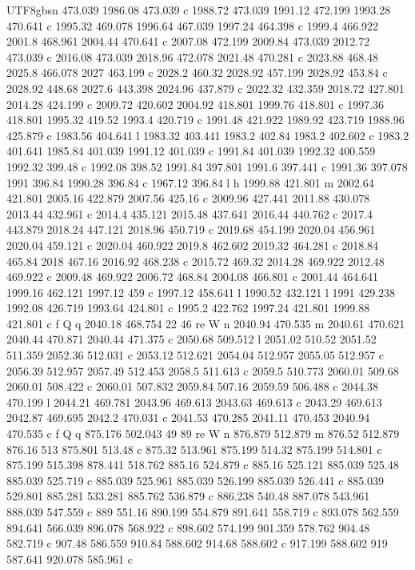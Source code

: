 \documentclass[11pt,a4paper,oneside]{report}
\begin{document}
\begin{CJK*}{UTF8}{gbsn}
{473.039 1986.08 473.039 c 1988.72 473.039 1991.12 472.199 1993.28 470.641 c 1995.32 469.078 1996.64
467.039 1997.24 464.398 c 1999.4 466.922 2001.8 468.961 2004.44 470.641 c 2007.08 472.199 2009.84 473.039
2012.72 473.039 c 2016.08 473.039 2018.96 472.078 2021.48 470.281 c 2023.88 468.48 2025.8 466.078 2027
463.199 c 2028.2 460.32 2028.92 457.199 2028.92 453.84 c 2028.92 448.68 2027.6 443.398 2024.96 437.879 c
2022.32 432.359 2018.72 427.801 2014.28 424.199 c 2009.72 420.602 2004.92 418.801 1999.76 418.801 c
1997.36 418.801 1995.32 419.52 1993.4 420.719 c 1991.48 421.922 1989.92 423.719 1988.96 425.879 c 1983.56
404.641 l 1983.32 403.441 1983.2 402.84 1983.2 402.602 c 1983.2 401.641 1985.84 401.039 1991.12 401.039 c
1991.84 401.039 1992.32 400.559 1992.32 399.48 c 1992.08 398.52 1991.84 397.801 1991.6 397.441 c 1991.36
397.078 1991 396.84 1990.28 396.84 c 1967.12 396.84 l h 1999.88 421.801 m 2002.64 421.801 2005.16 422.879
2007.56 425.16 c 2009.96 427.441 2011.88 430.078 2013.44 432.961 c 2014.4 435.121 2015.48 437.641 2016.44
440.762 c 2017.4 443.879 2018.24 447.121 2018.96 450.719 c 2019.68 454.199 2020.04 456.961 2020.04
459.121 c 2020.04 460.922 2019.8 462.602 2019.32 464.281 c 2018.84 465.84 2018 467.16 2016.92 468.238 c
2015.72 469.32 2014.28 469.922 2012.48 469.922 c 2009.48 469.922 2006.72 468.84 2004.08 466.801 c 2001.44
464.641 1999.16 462.121 1997.12 459 c 1997.12 458.641 l 1990.52 432.121 l 1991 429.238 1992.08 426.719
1993.64 424.801 c 1995.2 422.762 1997.24 421.801 1999.88 421.801 c f Q q 2040.18 468.754 22 46 re W n
2040.94 470.535 m 2040.61 470.621 2040.44 470.871 2040.44 471.375 c 2050.68 509.512 l 2051.02 510.52
2051.52 511.359 2052.36 512.031 c 2053.12 512.621 2054.04 512.957 2055.05 512.957 c 2056.39 512.957
2057.49 512.453 2058.5 511.613 c 2059.5 510.773 2060.01 509.68 2060.01 508.422 c 2060.01 507.832 2059.84
507.16 2059.59 506.488 c 2044.38 470.199 l 2044.21 469.781 2043.96 469.613 2043.63 469.613 c 2043.29
469.613 2042.87 469.695 2042.2 470.031 c 2041.53 470.285 2041.11 470.453 2040.94 470.535 c f Q q 875.176
502.043 49 89 re W n 876.879 512.879 m 876.52 512.879 876.16 513 875.801 513.48 c 875.32 513.961 875.199
514.32 875.199 514.801 c 875.199 515.398 878.441 518.762 885.16 524.879 c 885.16 525.121 885.039 525.48
885.039 525.719 c 885.039 525.961 885.039 526.199 885.039 526.441 c 885.039 529.801 885.281 533.281
885.762 536.879 c 886.238 540.48 887.078 543.961 888.039 547.559 c 889 551.16 890.199 554.879 891.641
558.719 c 893.078 562.559 894.641 566.039 896.078 568.922 c 898.602 574.199 901.359 578.762 904.48
582.719 c 907.48 586.559 910.84 588.602 914.68 588.602 c 917.199 588.602 919 587.641 920.078 585.961 c
}
\end{CJK*}
\end{document}
